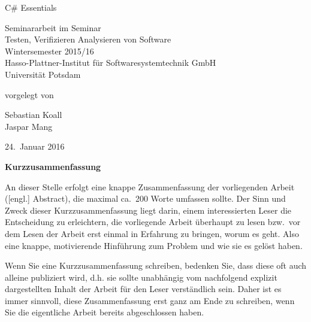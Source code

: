 \documentclass[11pt, a4paper]{article}
\begin{document}
          

\begin{titlepage}
  \begin{center} 
    \mbox{}
    \vspace{1cm}
    
    {\huge C\# Essentials \\[1em] {\LARGE }}  
        
    \vspace{5cm}
    
    Seminararbeit im Seminar \\[1em]
    {\large \sc Testen, Verifizieren Analysieren von Software} \\[1em]
    Wintersemester 2015/16 \\[1em]
    Hasso-Plattner-Institut für Softwaresystemtechnik GmbH \\[1em]
    Universität Potsdam
    
    \vspace{4cm}
    
		vorgelegt von
		
    \vspace{1em}
    
		{\Large Sebastian Koall} \\
		{\Large Jaspar Mang}
		
    \vspace{4em}
    
    24.~Januar 2016
  \end{center}
\end{titlepage}


\setcounter{page}{1}

\begin{center}
{\bf Kurzzusammenfassung} 
\end{center}

\noindent
An dieser Stelle erfolgt eine knappe Zusammenfassung der vorliegenden Arbeit ([engl.] Abstract), die maximal ca.~200 Worte umfassen sollte. 
Der Sinn und Zweck dieser Kurzzusammenfassung liegt darin, einem interessierten Leser die Entscheidung zu erleichtern, die vorliegende Arbeit überhaupt zu lesen bzw.~vor dem Lesen der Arbeit erst einmal in Erfahrung zu bringen, worum es geht.
Also eine knappe, motivierende Hinführung zum Problem und wie sie es gelöst haben.

\bigskip

Wenn Sie eine Kurzzusammenfassung schreiben, bedenken Sie, dass diese oft auch alleine publiziert wird, d.h. sie sollte unabhängig vom nachfolgend explizit dargestellten Inhalt der Arbeit für den Leser verständlich sein.
Daher ist es immer sinnvoll, diese Zusammenfassung erst ganz am Ende zu schreiben, wenn Sie die eigentliche Arbeit bereits abgeschlossen haben.
\end{document}
